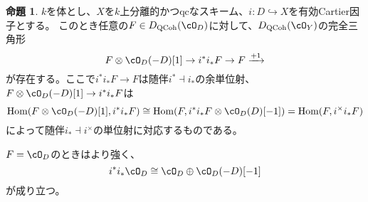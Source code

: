 \documentclass[uplatex, a4paper, dvipdfmx]{jsarticle}
\theoremstyle{definition}
\newtheorem{proposition}[theorem]{命題}
\DeclareMathOperator{\Hom}{\mathrm{Hom}}
\DeclareMathOperator{\QCoh}{\mathrm{QCoh}}
\begin{document}
\begin{proposition}\label{prop:triangle-for-push-pull}
    $k$を体とし、$X$を$k$上分離的かつqcなスキーム、$i \colon D \hookrightarrow X$を有効Cartier因子とする。
    このとき任意の$F \in D_{\QCoh}(\cO_D)$に対して、$D_{\QCoh}(\cO_Y)$の完全三角形
    \begin{equation}
        F \otimes \cO_D(-D)[1] \to i^*i_*F \to F \xrightarrow{+1}
    \end{equation}
    が存在する。ここで$i^*i_*F \to F$は随伴$i^* \dashv i_*$の余単位射、$F \otimes \cO_D(-D)[1] \to i^*i_*F$は
    \begin{equation}
        \Hom(F \otimes \cO_D(-D)[1], i^*i_*F) \cong \Hom(F, i^*i_*F\otimes \cO_D(D)[-1]) = \Hom(F, i^\times i_*F)
    \end{equation}
    によって随伴$i_* \dashv i^\times$の単位射に対応するものである。

    $F = \cO_D$のときはより強く、
    \begin{equation}
        i^*i_*\cO_D \cong \cO_D \oplus \cO_D(-D)[-1]
    \end{equation}
    が成り立つ。
\end{proposition}
\end{document}
